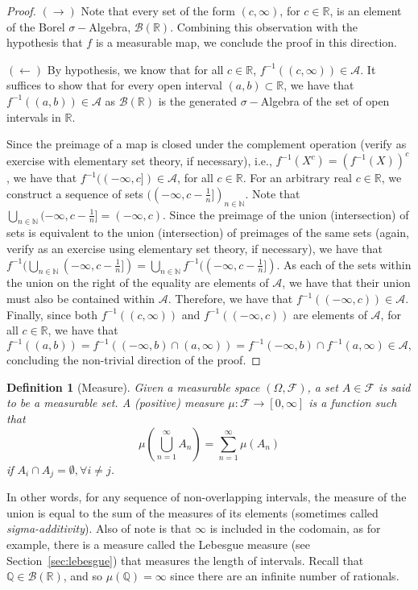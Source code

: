 \documentclass[10pt, oneside]{article}
\newcommand{\R}{\mathbb{R}}
\newcommand{\N}{\mathbb{N}}
\newcommand{\Q}{\mathbb{Q}}
\newtheorem{defn}{Definition}
\begin{document}
\begin{proof}
    $(\rightarrow)$ Note that every set of the form $(c,\infty)$, for $c \in \R$, 
    is an element of the Borel $\sigma-$Algebra, $\mathcal{B}(\R)$. Combining this 
    observation with the hypothesis that $f$ is a measurable map, we conclude the 
    proof in this direction. 

    $(\leftarrow)$ By hypothesis, we know that for all $c \in \R$, $f^{-1}((c,\infty))
    \in \mathcal{A}$. It suffices to show that for every open interval $(a,b) \subset
    \R$, we have that $f^{-1}((a,b)) \in \mathcal{A}$ as $\mathcal{B}(\R)$ is the 
    generated $\sigma-$Algebra of the set of open intervals in $\R$. 

    Since the preimage of a map is closed under the complement operation (verify as 
    exercise with elementary set theory, if necessary), i.e., $f^{-1}(X^{c}) = 
    (f^{-1}(X))^{c}$, we have that $f^{-1}((-\infty,c]) \in \mathcal{A}$, for all 
    $c \in \R$. For an arbitrary
    real $c \in \R$, we construct a sequence of sets $((-\infty,c-\frac{1}{n}])_{n 
    \in \N}$. Note that $\bigcup_{n \in \N}(-\infty,c-\frac{1}{n}] = (-\infty,c)$. 
    Since the preimage of the union (intersection) of sets is equivalent to the union
    (intersection) of preimages of the same sets (again, verify as an exercise using 
    elementary set theory, if necessary), we have that $f^{-1}(\bigcup_{n \in \N}(-\infty,
    c-\frac{1}{n}]) = \bigcup_{n \in \N}f^{-1}((-\infty,c-\frac{1}{n}])$. As each of the
    sets within the union on the right of the equality are elements of $\mathcal{A}$, we
    have that their union must also be contained within $\mathcal{A}$. Therefore, we
    have that $f^{-1}((-\infty,c)) \in \mathcal{A}$. Finally, since both $f^{-1}((c,
    \infty))$ and $f^{-1}((-\infty, c))$ are elements of $\mathcal{A}$, for all $c \in \R$, 
    we have that 
    \[f^{-1}((a,b)) = f^{-1}((-\infty,b) \cap (a,\infty)) = f^{-1}(-\infty, b) \cap f^{-1}
    (a, \infty) \in \mathcal{A}, \]
    concluding the non-trivial direction of the proof. 
    
\end{proof}

\begin{defn}[Measure]
    \label{defn:measure}
    Given a measurable space $(\Omega,\mathcal{F})$, a set $A\in \mathcal{F}$ is said to be a measurable set.
    A (positive) measure $\mu:\mathcal{F}\to [0,\infty]$ is a function such that
    $$\mu(\bigcup_{n=1}^{\infty}A_n)=\sum_{n=1}^{\infty}\mu(A_n)$$ if $A_i\cap A_j=\emptyset,
    \forall i\ne j$. 
\end{defn}
In other words, for any sequence of non-overlapping intervals, the measure of the union is equal to the sum of the measures of its elements (sometimes called \emph{sigma-additivity}).
Also of note is that $\infty$ is included in the codomain, as for example, there is a measure
called the Lebesgue measure (see Section~\ref{sec:lebesgue}) that measures the length of
intervals. Recall that $\Q\in\mathcal{B}(\R)$, and so $\mu(\Q)=\infty$ since there are an
infinite number of rationals.
\dhanush{Need to correct measure of $\Q$. }
\end{document}
